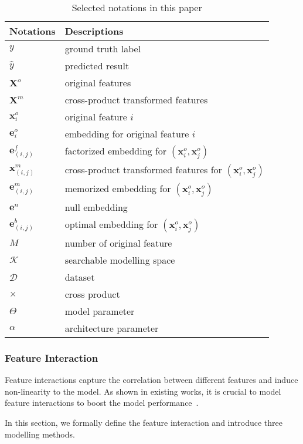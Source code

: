 \documentclass[conference]{IEEEtran}
\begin{document}
\begin{table}[htbp]   
\renewcommand\arraystretch{1.15}
\centering
\caption{Selected notations in this paper}  
\begin{tabular}{l|l}    
\hline
\textbf{Notations} & \textbf{Descriptions} \\    
\hline
$y$ & ground truth label\\
$\hat{y}$ & predicted result \\
$\mathbf{X}^{o}$ & original features\\
$\mathbf{X}^{m}$ &  cross-product transformed features \\
$\mathbf{x}^{o}_i$ & original feature $i$ \\
$\mathbf{e}^{o}_i$ & embedding for original feature $i$ \\
$\mathbf{e}^{f}_{(i,j)}$ & factorized embedding for $(\mathbf{x}^o_i,\mathbf{x}^o_j)$ \\
$\mathbf{x}^{m}_{(i,j)}$ & cross-product transformed features for $(\mathbf{x}^o_i,\mathbf{x}^o_j)$ \\
$\mathbf{e}^{m}_{(i,j)}$ & memorized embedding for $(\mathbf{x}^o_i,\mathbf{x}^o_j)$ \\
$\mathbf{e}^{n}$ & null embedding \\
$\mathbf{e}^{b}_{(i,j)}$ & optimal embedding for $(\mathbf{x}^o_i,\mathbf{x}^o_j)$ \\
$M$ & number of original feature \\
$\mathcal{K}$ & searchable modelling space \\
$\mathcal{D}$ & dataset \\
$\times$ & cross product \\
$\Theta$ & model parameter \\
$\alpha$ & architecture parameter \\
\hline
\end{tabular}
\label{Table:notation}
\end{table}

\subsubsection{Feature Interaction}
\label{sec:feature_interaction}
Feature interactions capture the correlation between different features and induce non-linearity to the model. As shown in existing works, it is crucial to model feature interactions to boost the model performance~\cite{PNN16,PNN19,DeepFM,Wide_Deep,FNN}. 

In this section, we formally define the feature interaction and introduce three modelling methods.
\end{document}

